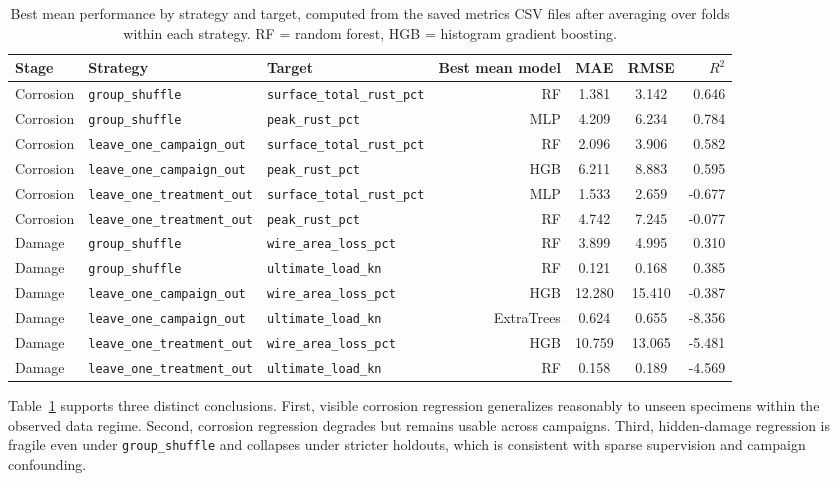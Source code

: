 \documentclass[11pt,a4paper]{article}
\begin{document}
\begin{table}[H]
\centering
\scriptsize
\begin{tabular}{lllrccr}
\toprule
\textbf{Stage} & \textbf{Strategy} & \textbf{Target} & \textbf{Best mean model} & \textbf{MAE} & \textbf{RMSE} & \textbf{\(R^2\)} \\
\midrule
Corrosion & \texttt{group\_shuffle} & \texttt{surface\_total\_rust\_pct} & RF & 1.381 & 3.142 & 0.646 \\
Corrosion & \texttt{group\_shuffle} & \texttt{peak\_rust\_pct} & MLP & 4.209 & 6.234 & 0.784 \\
Corrosion & \texttt{leave\_one\_campaign\_out} & \texttt{surface\_total\_rust\_pct} & RF & 2.096 & 3.906 & 0.582 \\
Corrosion & \texttt{leave\_one\_campaign\_out} & \texttt{peak\_rust\_pct} & HGB & 6.211 & 8.883 & 0.595 \\
Corrosion & \texttt{leave\_one\_treatment\_out} & \texttt{surface\_total\_rust\_pct} & MLP & 1.533 & 2.659 & -0.677 \\
Corrosion & \texttt{leave\_one\_treatment\_out} & \texttt{peak\_rust\_pct} & RF & 4.742 & 7.245 & -0.077 \\
\midrule
Damage & \texttt{group\_shuffle} & \texttt{wire\_area\_loss\_pct} & RF & 3.899 & 4.995 & 0.310 \\
Damage & \texttt{group\_shuffle} & \texttt{ultimate\_load\_kn} & RF & 0.121 & 0.168 & 0.385 \\
Damage & \texttt{leave\_one\_campaign\_out} & \texttt{wire\_area\_loss\_pct} & HGB & 12.280 & 15.410 & -0.387 \\
Damage & \texttt{leave\_one\_campaign\_out} & \texttt{ultimate\_load\_kn} & ExtraTrees & 0.624 & 0.655 & -8.356 \\
Damage & \texttt{leave\_one\_treatment\_out} & \texttt{wire\_area\_loss\_pct} & HGB & 10.759 & 13.065 & -5.481 \\
Damage & \texttt{leave\_one\_treatment\_out} & \texttt{ultimate\_load\_kn} & RF & 0.158 & 0.189 & -4.569 \\
\bottomrule
\end{tabular}
\caption{Best mean performance by strategy and target, computed from the saved metrics CSV files after averaging over folds within each strategy. RF = random forest, HGB = histogram gradient boosting.}
\label{tab:continuous-results}
\end{table}

Table~\ref{tab:continuous-results} supports three distinct conclusions. First, visible corrosion regression generalizes reasonably to unseen specimens within the observed data regime. Second, corrosion regression degrades but remains usable across campaigns. Third, hidden-damage regression is fragile even under \texttt{group\_shuffle} and collapses under stricter holdouts, which is consistent with sparse supervision and campaign confounding.
\end{document}
